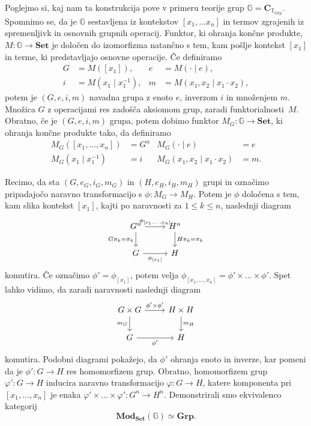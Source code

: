 \documentclass[../kategoricna_logika.tex]{subfiles}
\begin{document}
\begin{primer}
  Poglejmo si, kaj nam ta konstrukcija pove v primeru teorije grup
  $\mathbb{G} = \mathbf{C}_{\mathbb{T}_{\mathrm{Grp}}}$. Spomnimo se,
  da je $\mathbb{G}$ sestavljena iz kontekstov $[x_1, \ldots x_n]$ in
  termov zgrajenih iz spremenljivk in osnovnih grupnih operacij.
  Funktor, ki ohranja končne produkte, $M : \mathbb{G} \to \mathbf{Set}$
  je določen do izomorfizma natančno s tem, kam pošlje kontekst $[x_1]$
  in terme, ki predstavljajo osnovne operacije. Če definiramo
\begin{align*}
  G &= M([x_1]), & e &= M(\cdot \mid e), \\
  i &= M(x_1 \mid x_1^{-1}), & m &= M(x_1,x_2 \mid x_1 \cdot x_2),
\end{align*}
potem je $(G,e,i,m)$ navadna grupa z enoto $e$, inverzom $i$ in
množenjem $m$. Množica $G$ z operacijami res zadošča aksiomom
grup, zaradi funktorialnosti~$M$. Obratno, če je $(G,e,i,m)$ grupa,
potem dobimo funktor $M_{G} : \mathbb{G} \to \mathbf{Set}$,
ki ohranja končne produkte tako, da definiramo
\begin{align*}
  M_{G}([x_1, \ldots, x_n]) &= G^n & M_{G}(\cdot \mid e) &= e \\
  M_{G}(x_1 \mid x_1^{-1}) &= i & M_{G}(x_1, x_2 \mid x_1 \cdot x_2) &= m.
\end{align*}

Recimo, da sta $(G,e_{G}, i_{G}, m_{G})$ in $(H, e_H, i_H, m_H)$ grupi
in označimo pripadajočo naravno transformacijo s ${\phi : M_{G} \to M_H}$.
Potem je $\phi$ določena s tem, kam slika kontekst $[x_1]$,
kajti po naravnosti za $1 \leq k \leq n$, naslednji diagram
\begin{equation*}
\begin{tikzcd}\label{primer:grupe-kot-funktorji}
  G^n \ar[d, "G\pi_k = \pi_k"'] \ar[r, "\phi_{[x_1, \ldots, x_n]}"] & H^n \ar[d, "H\pi_k = \pi_k"] \\
  G \ar[r, "\phi_{[x_1]}"'] & H
\end{tikzcd}
\end{equation*}
komutira. Če označimo $\phi' = \phi_{[x_1]}$, potem velja
$\phi_{[x_1, \ldots, x_n]} = \phi' \times \ldots \times \phi'$.
Spet lahko vidimo, da zaradi naravnosti naslednji diagram
\begin{equation*}
\begin{tikzcd}\label{sec:modeli-kot-funtorji-3}
  G \times G \ar[d, "m_{G}"'] \ar[r, "\phi' \times \phi'"] & H \times H \ar[d, "m_H"] \\
  G \ar[r, "\phi'"'] & H
\end{tikzcd}
\end{equation*}
komutira. Podobni diagrami pokažejo, da $\phi'$ ohranja enoto in
inverze, kar pomeni da je $\phi' : G \to H$ res homomorfizem grup.
Obratno, homomorfizem grup ${\varphi' : G \to H}$ inducira naravno
transformacijo $\varphi : G \to H$, katere komponenta pri
$[x_1, \ldots, x_n]$ je enaka $\varphi' \times \ldots \times \varphi' : G^n \to H^n$.
Demonstrirali smo ekvivalenco kategorij
\[ \mathbf{Mod}_{\mathbf{Set}}(\mathbb{G}) \simeq \mathbf{Grp}. \]
\end{primer}
\end{document}
